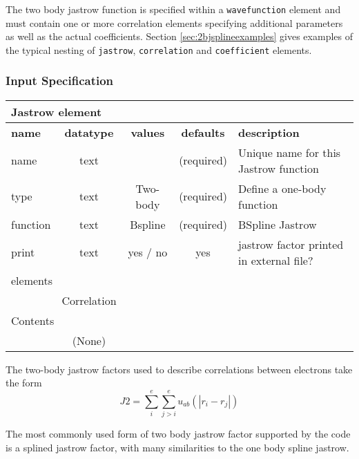  The two body jastrow function is specified within a \texttt{wavefunction} element
and must contain one or more correlation elements specifying additional parameters
as well as the actual coefficients.  Section \ref{sec:2bjsplineexamples} gives 
examples of the typical nesting of \texttt{jastrow}, \texttt{correlation} and
\texttt{coefficient} elements.

\subsubsection{Input Specification}

\begin{table}[h]
\begin{center}
\begin{tabular}{l c c c l }
\hline
\multicolumn{5}{l}{Jastrow element} \\
\hline
\bfseries name & \bfseries datatype & \bfseries values & \bfseries defaults  & \bfseries description \\
\hline
name & text &    & (required) & Unique name for this Jastrow function \\
type & text & Two-body & (required) & Define a one-body function \\ 
function & text & Bspline & (required) & BSpline Jastrow \\
print & text & yes / no & yes & jastrow factor printed in external file?\\
  \hline
\multicolumn{5}{l}{elements}\\ \hline
& Correlation & & & \\ \hline
\multicolumn{5}{l}{Contents}\\ \hline
& (None)  & & &  \\ \hline
\end{tabular}
\end{center}
\end{table}

The two-body jastrow factors used to describe correlations between electrons take the form
\begin{equation}
J2=\sum_i^{e}\sum_{j>i}^{e} u_{ab}(|r_i-r_j|)
\end{equation}

The most commonly used form of two body jastrow factor supported by the code is a splined
jastrow factor, with many similarities to the one body spline jastrow.





